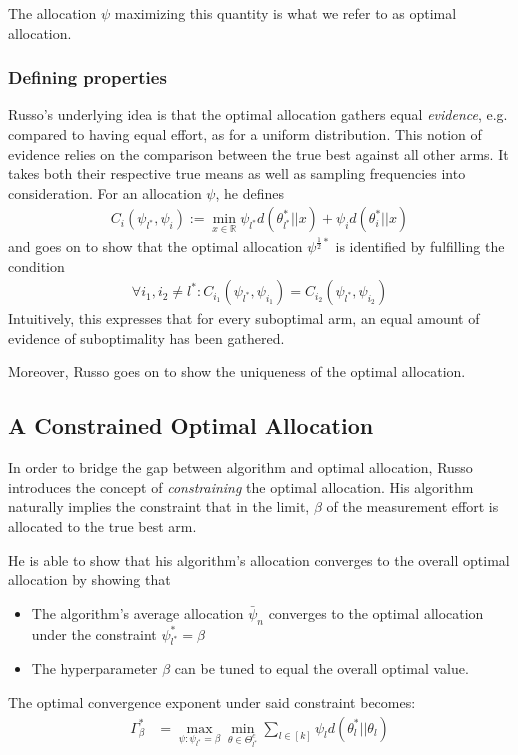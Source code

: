 The allocation $\psi$ maximizing this quantity is what we refer to as optimal allocation.

\subsubsection{Defining properties}
Russo's underlying idea is that the optimal allocation gathers equal \emph{evidence}, e.g. compared to having equal effort, as  for a uniform distribution. This notion of evidence relies on the comparison between the true best against all other arms. It takes both their respective true means as well as sampling frequencies into consideration. For an allocation $\psi$, he defines
\begin{align}
  C_i(\psi_{l^*}, \psi_i) := \min_{x \in \mathbb{R}} \psi_{l^*} d(\theta_{l^*}^*||x) + \psi_i d(\theta_{i}^*||x)
\end{align}
and goes on to show that the optimal allocation $\psi^{\frac{1}{2}*}$ is identified by fulfilling the condition
\begin{align}
  \forall i_1, i_2 \neq l^*: C_{i_1}(\psi_{l^*}, \psi_{i_1}) = C_{i_2}(\psi_{l^*}, \psi_{i_2})
\end{align}
Intuitively, this expresses that for every suboptimal arm, an equal amount of evidence of suboptimality has been gathered.

Moreover, Russo goes on to show the uniqueness of the optimal allocation.

\subsection{A Constrained Optimal Allocation}

In order to bridge the gap between algorithm and optimal allocation, Russo introduces the concept of \emph{constraining} the optimal allocation. His algorithm naturally implies the constraint that in the limit, $\beta$ of the measurement effort is allocated to the true best arm.

He is able to show that his algorithm's allocation converges to the overall optimal allocation by showing that
\begin{itemize}
  \item The algorithm's average allocation $\bar{\psi}_n$ converges to the optimal allocation under the constraint $\psi_{l^*}^* = \beta$
  \item The hyperparameter $\beta$ can be tuned to equal the overall optimal value.
\end{itemize}
The optimal convergence exponent under said constraint becomes:
\begin{align}
  \Gamma^*_{\beta} &= \max_{\psi: \psi_{l^*} = \beta} \min_{\theta \in \Theta^c_{l^*}} \sum_{l \in [k]} \psi_l d(\theta_l^* || \theta_l)
\end{align}

